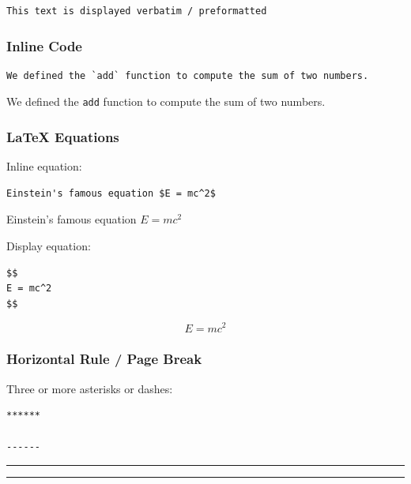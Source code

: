 \documentclass[]{book}
\begin{document}
\begin{verbatim}
This text is displayed verbatim / preformatted
\end{verbatim}

\hypertarget{inline-code}{%
\subsubsection{Inline Code}\label{inline-code}}

\begin{verbatim}
We defined the `add` function to compute the sum of two numbers.
\end{verbatim}

We defined the \texttt{add} function to compute the sum of two numbers.

\hypertarget{latex-equations}{%
\subsubsection{LaTeX Equations}\label{latex-equations}}

Inline equation:

\begin{verbatim}
Einstein's famous equation $E = mc^2$
\end{verbatim}

Einstein's famous equation \(E = mc^2\)

Display equation:

\begin{verbatim}
$$
E = mc^2
$$
\end{verbatim}

\[
E = mc^2
\]

\hypertarget{horizontal-rule-page-break}{%
\subsubsection{Horizontal Rule / Page Break}\label{horizontal-rule-page-break}}

Three or more asterisks or dashes:

\begin{verbatim}
******

------
\end{verbatim}

\begin{center}\rule{0.5\linewidth}{\linethickness}\end{center}

\begin{center}\rule{0.5\linewidth}{\linethickness}\end{center}
\end{document}
